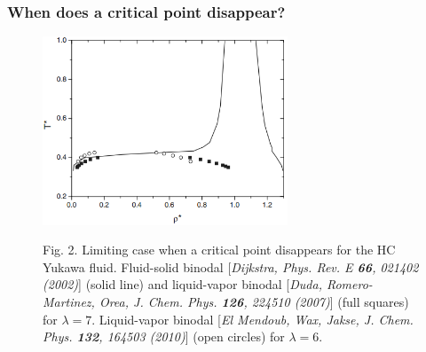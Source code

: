 \documentclass[8pt]{beamer}
\begin{document}
	\begin{frame}
		\frametitle{When does a critical point disappear?}
		
		\begin{figure}[htbp]
			\includegraphics[width=0.65\textwidth,angle=0]{limit_cp} \\
			\parbox{0.8\textwidth}{\caption*{Fig. 2. Limiting case when a critical point disappears for the HC Yukawa fluid. Fluid-solid binodal [\textit{Dijkstra, Phys. Rev. E \textbf{66}, 021402 (2002)}] (solid line) and liquid-vapor binodal [\textit{Duda, Romero-Martinez, Orea, J. Chem. Phys. \textbf{126}, 224510 (2007)}] (full squares) for $\lambda=7$. Liquid-vapor binodal [\textit{El Mendoub, Wax, Jakse, J. Chem. Phys. \textbf{132}, 164503 (2010)}] (open circles) for $\lambda = 6$.
			}}
		\end{figure}
		
	\end{frame}
	
\end{document}
